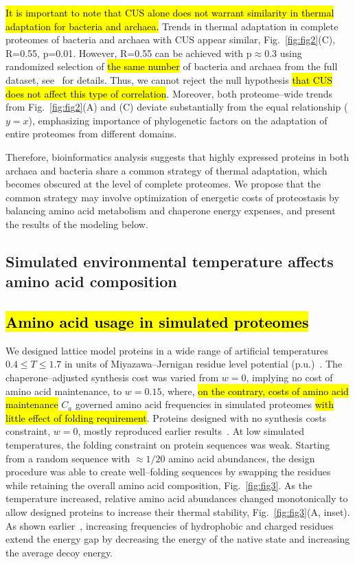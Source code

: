 \documentclass[10pt,letterpaper]{article}
\begin{document}
\hl{It is important to note that CUS alone does not warrant similarity in thermal adaptation for bacteria and archaea.} Trends in thermal adaptation in complete proteomes of bacteria and archaea with CUS appear similar, Fig.~\ref{fig:fig2}(C), R=0.55, p=0.01. However, R=0.55 can be achieved with p$\approx$0.3 using randomized selection of \hl{the same number} of bacteria and archaea from the full dataset, see~ for details. Thus, we cannot reject the null hypothesis \hl{that CUS does not affect this type of correlation}. Moreover, both proteome--wide trends from Fig.~\ref{fig:fig2}(A) and (C) deviate substantially from the equal relationship ($y=x$), emphasizing importance of phylogenetic factors on the adaptation of entire proteomes from different domains. 

Therefore, bioinformatics analysis suggests that highly expressed proteins in both archaea and bacteria share a common strategy of thermal adaptation, which becomes obscured at the level of complete proteomes. We propose that the common strategy may involve optimization of energetic costs of proteostasis by balancing amino acid metabolism and chaperone energy expenses, and present the results of the modeling below. 

\subsection*{Simulated environmental temperature affects amino acid composition}
\subsection*{\hl{Amino acid usage in simulated proteomes}}

We designed lattice model proteins in a wide range of artificial temperatures $0.4\leq T\leq 1.7$ in units of Miyazawa--Jernigan residue level potential (p.u.)~\cite{Miyazawa1999SelfConsistent}. The chaperone--adjusted synthesis cost was varied from $w=0$, implying no cost of amino acid maintenance, to $w=0.15$, where, \hl{on the contrary, costs of amino acid maintenance} $C_{a}$ governed amino acid frequencies in simulated proteomes \hl{with little effect of folding requirement}. Proteins designed with no synthesis costs constraint, $w=0$, mostly reproduced earlier results~\cite{Berezovsky2007Positive,Venev2015Massively}. At low simulated temperatures, the folding constraint on protein sequences was weak. Starting from a random sequence with $\approx 1/20$ amino acid abundances, the design procedure was able to create well--folding sequences by swapping the residues while retaining the overall amino acid composition, Fig.~\ref{fig:fig3}. As the temperature increased, relative amino acid abundances changed monotonically to allow designed proteins to increase their thermal stability, Fig.~\ref{fig:fig3}(A, inset). As shown earlier~\cite{Berezovsky2007Positive}, increasing frequencies of hydrophobic and charged residues extend the energy gap by decreasing the energy of the native state and increasing the average decoy energy. 
\end{document}

